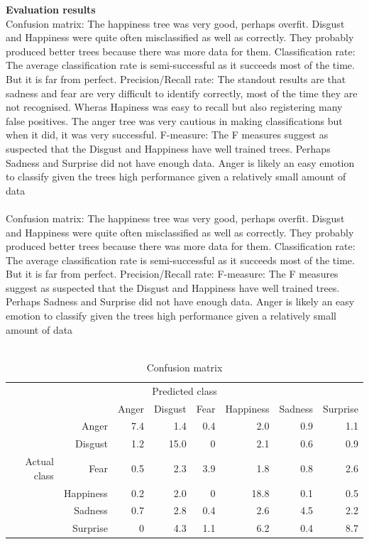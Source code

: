 \documentclass[12pt]{article}
\begin{document}
{\bf Evaluation results} \\
Confusion matrix: The happiness tree was very good, perhaps overfit. Disgust and Happiness were quite often misclassified as well as correctly. They probably produced better trees because there was more data for them. Classification rate: The average classification rate is semi-successful as it succeeds most of the time. But it is far from perfect. Precision/Recall rate: The standout results are that sadness and fear are very difficult to identify correctly, most of the time they are not recognised. Wheras Hapiness was easy to recall but also registering many false positives. The anger tree was very cautious in making classifications but when it did, it was very successful.  F-measure: The F measures suggest as suspected that the Disgust and Happiness have well trained trees. Perhaps Sadness and Surprise did not have enough data. Anger is likely an easy emotion to classify given the trees high performance given a relatively small amount of data \\ \\

Confusion matrix: The happiness tree was very good, perhaps overfit. Disgust and Happiness were quite often misclassified as well as correctly. They probably produced better trees because there was more data for them. Classification rate: The average classification rate is semi-successful as it succeeds most of the time. But it is far from perfect. Precision/Recall rate:  F-measure: The F measures suggest as suspected that the Disgust and Happiness have well trained trees. Perhaps Sadness and Surprise did not have enough data. Anger is likely an easy emotion to classify given the trees high performance given a relatively small amount of data \\ \\

\begin{table}
\centering
\begin{tabular}{r r | r r r r r r}
\multicolumn{8}{c}{Predicted class} \\
&  & Anger & Disgust & Fear & Happiness & Sadness & Surprise \\
\hline
& Anger & 7.4 & 1.4  & 0.4 & 2.0  & 0.9 & 1.1 \\
 & Disgust & 1.2 & 15.0 & 0   & 2.1  & 0.6 & 0.9 \\
Actual class & Fear & 0.5 & 2.3  & 3.9 & 1.8  & 0.8 & 2.6 \\
 & Happiness & 0.2 & 2.0  & 0   & 18.8 & 0.1 & 0.5 \\
& Sadness & 0.7 & 2.8  & 0.4 & 2.6  & 4.5 & 2.2 \\
& Surprise & 0   & 4.3  & 1.1 & 6.2  & 0.4 & 8.7 \\
\end{tabular}
\caption{Confusion matrix}
\end{table}
\end{document}
